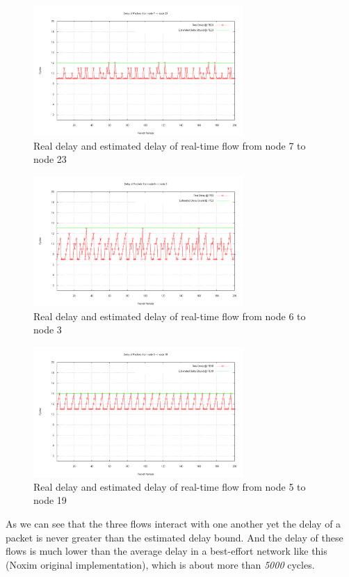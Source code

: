 \documentclass[conference, twocolumn]{IEEEtran}
\theoremstyle{definition}
\begin{document}
\begin{figure}[htp]
\centering
\includegraphics[width=8cm]{pics/PE23.png}
\caption[Flow from node 7 to node 23.]
{Real delay and estimated delay of real-time flow from node
7 to node 23}\label{fig:PE7PE23}
\end{figure}

\begin{figure}[htp]
\centering
\includegraphics[width=8cm]{pics/PE3.png}
\caption[Three flows example.]
{Real delay and estimated delay of real-time flow from node
6 to node 3}\label{fig:PE6PE3}
\end{figure}

\begin{figure}[htp]
\centering
\includegraphics[width=8cm]{pics/PE19.png}
\caption[Three flows example.]
{Real delay and estimated delay of real-time flow from node
5 to node 19}\label{fig:PE5PE19}
\end{figure}

As we can see that the three flows interact with one another yet the delay of a
packet is never greater than the estimated delay bound. And the delay of these
flows is much lower than the average delay in a best-effort network like
this (Noxim original implementation), which is about more than {\em 5000}
cycles.
\end{document}
